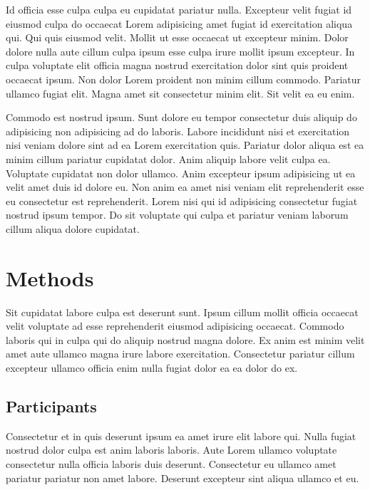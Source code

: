 \documentclass[
  super,
  preprint,
  3p]{elsarticle}
\begin{document}
Id officia esse culpa culpa eu cupidatat pariatur nulla. Excepteur velit
fugiat id eiusmod culpa do occaecat Lorem adipisicing amet fugiat id
exercitation aliqua qui. Qui quis eiusmod velit. Mollit ut esse occaecat
ut excepteur minim. Dolor dolore nulla aute cillum culpa ipsum esse
culpa irure mollit ipsum excepteur. In culpa voluptate elit officia
magna nostrud exercitation dolor sint quis proident occaecat ipsum. Non
dolor Lorem proident non minim cillum commodo. Pariatur ullamco fugiat
elit. Magna amet sit consectetur minim elit. Sit velit ea eu enim.

Commodo est nostrud ipsum. Sunt dolore eu tempor consectetur duis
aliquip do adipisicing non adipisicing ad do laboris. Labore incididunt
nisi et exercitation nisi veniam dolore sint ad ea Lorem exercitation
quis. Pariatur dolor aliqua est ea minim cillum pariatur cupidatat
dolor. Anim aliquip labore velit culpa ea. Voluptate cupidatat non dolor
ullamco. Anim excepteur ipsum adipisicing ut ea velit amet duis id
dolore eu. Non anim ea amet nisi veniam elit reprehenderit esse eu
consectetur est reprehenderit. Lorem nisi qui id adipisicing consectetur
fugiat nostrud ipsum tempor. Do sit voluptate qui culpa et pariatur
veniam laborum cillum aliqua dolore cupidatat.

\hypertarget{methods-1}{%
\section{Methods}\label{methods-1}}

Sit cupidatat labore culpa est deserunt sunt. Ipsum cillum mollit
officia occaecat velit voluptate ad esse reprehenderit eiusmod
adipisicing occaecat. Commodo laboris qui in culpa qui do aliquip
nostrud magna dolore. Ex anim est minim velit amet aute ullamco magna
irure labore exercitation. Consectetur pariatur cillum excepteur ullamco
officia enim nulla fugiat dolor ea ea dolor do ex.

\hypertarget{participants}{%
\subsection{Participants}\label{participants}}

Consectetur et in quis deserunt ipsum ea amet irure elit labore qui.
Nulla fugiat nostrud dolor culpa est anim laboris laboris. Aute Lorem
ullamco voluptate consectetur nulla officia laboris duis deserunt.
Consectetur eu ullamco amet pariatur pariatur non amet labore. Deserunt
excepteur sint aliqua ullamco et eu.
\end{document}
